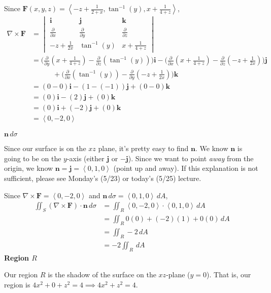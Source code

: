 \documentclass{article}
\newcommand{\lrp}[1]{\left( #1 \right)}
\newcommand{\lra}[1]{\left\langle #1 \right\rangle}
\renewcommand{\i}[0]{\mathbf{i}}
\renewcommand{\j}[0]{\mathbf{j}}
\renewcommand{\k}[0]{\mathbf{k}}
\newcommand{\F}[0]{\mathbf{F}}
\newcommand{\n}[0]{\mathbf{n}}
\begin{document}
Since $\displaystyle
    \F(x,y,z)=\lra{-z+\frac{1}{2+x},\tan^{-1}(y),x+\frac{1}{4+z}}$,
\begin{align*}
   \nabla \times \F&=\begin{vmatrix}\i & \j & \k\\ \frac{\partial}{\partial x} & \frac{\partial}{\partial y}& \frac{\partial}{\partial z}\\ -z +\frac{1}{2x} & \tan^{-1}(y) & x+\frac{1}{4+z}\end{vmatrix}\\
    &=\Bigg(\frac{\partial }{\partial y}\lrp{ x+\frac{1}{4+z}}-\frac{\partial }{\partial z}(\tan^{-1}(y))\Bigg)\i-\Bigg(\frac{\partial}{\partial x}\lrp{ x+\frac{1}{4+z}}-\frac{\partial}{\partial z}\lrp{-z +\frac{1}{2x}}\Bigg)\j\\
    &\hspace{3em}+\Bigg(\frac{\partial}{\partial x}(\tan^{-1}(y))-\frac{\partial}{\partial y}\lrp{-z +\frac{1}{2x}}\Bigg)\k\\
    &=\lrp{0-0}\i -\lrp{1-(-1)}\j+\lrp{0-0}\k\\
    &=\lrp{0}\i-\lrp{2}\j+\lrp{0}\k\\
    &=\lrp{0}\i+\lrp{-2}\j+\lrp{0}\k\\
    &=\lra{0,-2,0}
\end{align*}

{}$\n\,d\sigma$

Since our surface is on the $xz$ plane, it's pretty easy to find $\n$. We know $\n$ is going to be on the $y$-axis (either $\j$ or $-\j$). Since we want to point \textit{away} from the origin, we know $\n = \j=\lra{0,1,0}$ (point up and away). If this explanation is not sufficient, please see Monday's (5/23) or today's (5/25) lecture.


Since $\nabla \times \F=\lra{0,-2,0}$ and $\n\,d\sigma = \lra{0,1,0}\,dA$,
\begin{align*}
    \iint_S \lrp{\nabla \times \F}\cdot \n\,d\sigma &= \iint_R \lra{0,-2,0}\cdot \lra{0,1,0}\,dA\\
    &=\iint_R 0(0) + (-2)(1) + 0(0)\,dA\\
    &=\iint_R -2 \,dA\\
    &=-2 \iint_R \,dA\tag{we can take constants out}
\end{align*}
\textbf{Region $R$}

Our region $R$ is the shadow of the surface on the $xz$-plane ($y=0$). That is, our region is $4x^2+0+z^2=4\implies 4x^2+z^2=4$.
\end{document}
